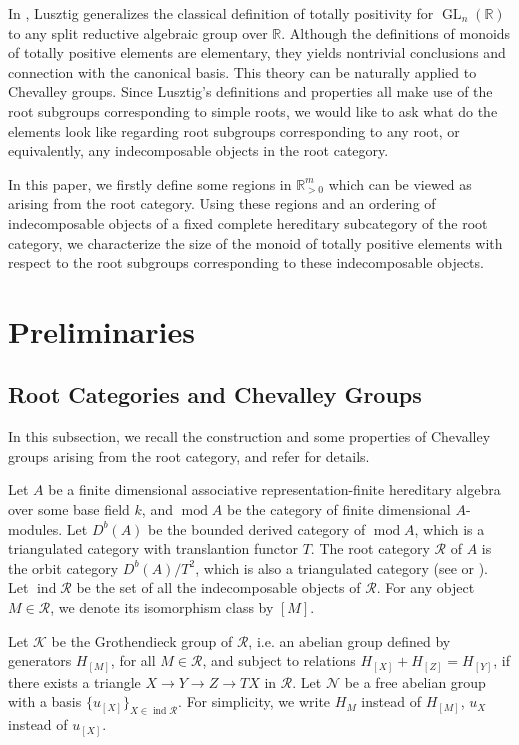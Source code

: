 \documentclass[12pt]{amsart}
\begin{document}
In \cite{TR1}, Lusztig generalizes the classical definition of totally positivity for $\operatorname{GL}_n(\mathbb{R})$ to any split reductive algebraic group over $\mathbb{R}$.
Although the definitions of monoids of totally positive elements are elementary, they yields nontrivial conclusions and connection with the canonical basis.
This theory can be naturally applied to Chevalley groups.
Since Lusztig's definitions and properties all make use of the root subgroups corresponding to simple roots, we would like to ask what do the elements look like regarding root subgroups corresponding to any root, or equivalently, any indecomposable objects in the root category.

In this paper, we firstly define some regions in $\mathbb{R}_{>0}^m$ which can be viewed as arising from the root category.
Using these regions and an ordering of indecomposable objects of a fixed complete hereditary subcategory of the root category, we characterize the size of the monoid of totally positive elements with respect to the root subgroups corresponding to these indecomposable objects.




\section{Preliminaries}

\subsection{Root Categories and Chevalley Groups}

In this subsection, we recall the construction and some  properties of Chevalley groups arising from the root category, and refer \cite{notes1} for details.

Let $A$ be a finite dimensional associative representation-finite hereditary algebra over some base field $k$, and $\operatorname{mod}A$ be the category of finite dimensional $A$-modules. Let $D^b(A)$ be the bounded derived category of $\operatorname{mod}A$, which is a triangulated category with translantion functor $T$. The root category $\mathcal{R}$ of $A$ is the orbit category $D^b(A)/T^2$, which is also a triangulated category (see \cite{1997ROOT} or \cite{Keller}). 
Let $\operatorname{ind}\mathcal{R}$ be the set of all the indecomposable objects of $\mathcal{R}$. For any object $M\in \mathcal{R}$, we denote its isomorphism class by $[M]$.

Let $\mathcal{K}$ be the Grothendieck group of $\mathcal{R}$, i.e. an abelian group defined by generators $H_{[M]}$, for all $M\in \mathcal{R}$, and subject to relations $H_{[X]}+H_{[Z]}=H_{[Y]}$, if there exists a triangle $X\rightarrow Y\rightarrow Z \rightarrow TX$ in $\mathcal{R}$.
Let $\mathcal{N}$ be a free abelian group with a basis $\{u_{[X]}\}_{X\in \operatorname{ind}\mathcal{R}}$. For simplicity, we write $H_M$ instead of $H_{[M]}$, $u_X$ instead of $u_{[X]}$.
\end{document}
